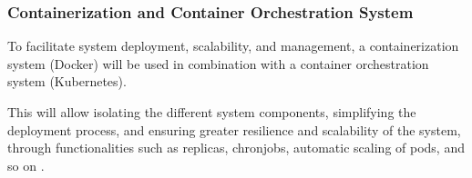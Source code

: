 \subsubsection{Containerization and Container Orchestration System}
To facilitate system deployment, scalability, and management, a containerization system (Docker) will be used in combination with a container orchestration system (Kubernetes).

This will allow isolating the different system components, simplifying the deployment process, and ensuring greater resilience and scalability of the system, through functionalities such as replicas, chronjobs, automatic scaling of pods, and so on \cite{kube_book}.